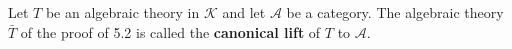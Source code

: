 Let $T$ be an algebraic theory in $\mathcal{K}$ and let $\mathcal{A}$ be a category. The algebraic theory $\bar{T}$ of the proof of 5.2 is called the \textbf{canonical lift} of $T$ to $\mathcal{A}$.
